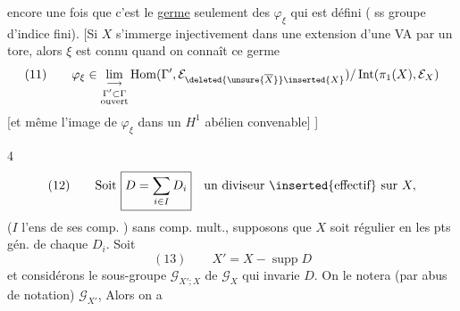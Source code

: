 encore une fois que c'est le \uline{germe}
seulement des $\varphi_\xi$ qui est défini
( ss groupe d'indice
fini). [Si $X$ s'immerge injectivement
dans une extension d'une VA par un
tore, alors $\xi$ est connu quand on
connaît ce germe
\[
(11)\qquad\varphi_\xi\in\underset{\substack{\Gamma'\subset\Gamma\\\text{ouvert}}}{\lim\limits_{\longrightarrow}}
\operatorname{Hom}(\Gamma',\mathcal E_{\deleted{\unsure{\overline X}}\inserted{X}})
/\operatorname{Int}(\pi_1(X),\mathcal E_X)
\]
[et même l'image de $\varphi_\xi$ dans un $H^1$ abélien
convenable\unsure{\ldots}] ]

\textcircled{4}
\[
(12)\qquad\text{Soit }\boxed{D=\sum_{i\in I}D_i}\quad\text{un diviseur \inserted{effectif} sur }X,
\]
($I$ l'ens de ses comp. ) sans comp. mult.,
supposons que $X$ soit régulier  en les
pts gén. de chaque $D_i$. Soit 
\[
(13)\qquad X'=X-\operatorname{supp}D
\]
et considérons le sous-groupe $\mathcal G_{X';X}$ de
$\mathcal G_X$ qui invarie $D$. On le notera  (par
abus de notation) $\mathcal G_{X'}$,  Alors on a
